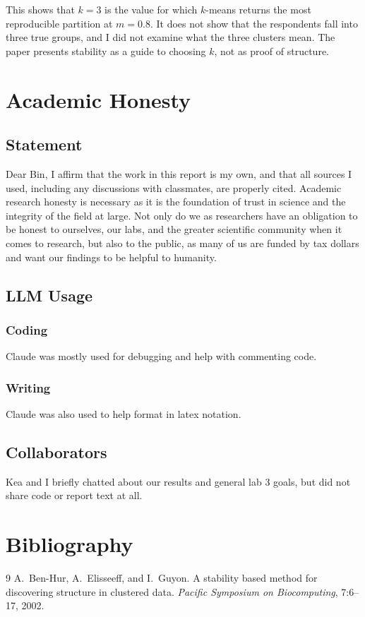 \documentclass[10pt,letterpaper]{article}
\begin{document}
This shows that $k=3$ is the value for which $k$-means returns the most reproducible partition at $m=0.8$. It does not show that the respondents fall into three true groups, and I did not examine what the three clusters mean. The paper presents stability as a guide to choosing $k$, not as proof of structure.

\section{Academic Honesty}

\subsection{Statement}
Dear Bin,
I affirm that the work in this report is my own, and that all sources I used, including any discussions with
classmates, are properly cited. Academic research honesty is necessary as it is the foundation of trust in
science and the integrity of the field at large. Not only do we as researchers have an obligation to be honest
to ourselves, our labs, and the greater scientific community when it comes to research, but also to the public,
as many of us are funded by tax dollars and want our findings to be helpful to humanity.
\subsection{LLM Usage}

\subsubsection*{Coding}
Claude was mostly used for debugging and help with commenting code. 
\subsubsection*{Writing}
Claude was also used to help format in latex notation. 
\subsection{Collaborators}
Kea and I briefly chatted about our results and general lab 3 goals, but did not share code or report text at all. 
\section{Bibliography}
{\renewcommand{\section}[2]{}%
\begin{thebibliography}{9}
 A.~Ben-Hur, A.~Elisseeff, and I.~Guyon. A stability based method for discovering structure in clustered data. \emph{Pacific Symposium on Biocomputing}, 7:6--17, 2002.
\end{thebibliography}
}
\end{document}
